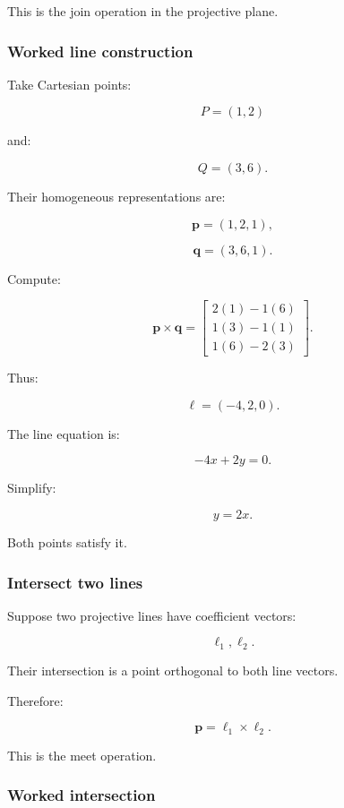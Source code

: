 This is the join operation in the projective plane.

\subsubsection{Worked line construction}\label{02-foundations-ii-ch032-worked-line-construction}

Take Cartesian points:

\[
 P=(1,2)
\]

and:

\[
 Q=(3,6).
\]

Their homogeneous representations are:

\[
 \mathbf p=(1,2,1),
\]

\[
 \mathbf q=(3,6,1).
\]

Compute:

\[
 \mathbf p\times\mathbf q= \begin{bmatrix} 2(1)-1(6)\\ 1(3)-1(1)\\ 1(6)-2(3) \end{bmatrix}.
\]

Thus:

\[
 \boxed{ \boldsymbol\ell=(-4,2,0) }.
\]

The line equation is:

\[
 -4x+2y=0.
\]

Simplify:

\[
 \boxed{y=2x}.
\]

Both points satisfy it.

\subsubsection{Intersect two lines}\label{02-foundations-ii-ch032-intersect-two-lines}

Suppose two projective lines have coefficient vectors:

\[
 \boldsymbol\ell_1,\boldsymbol\ell_2.
\]

Their intersection is a point orthogonal to both line vectors.

Therefore:

\[
 \boxed{ \mathbf p=\boldsymbol\ell_1\times\boldsymbol\ell_2 }.
\]

This is the meet operation.

\subsubsection{Worked intersection}\label{02-foundations-ii-ch032-worked-intersection}

